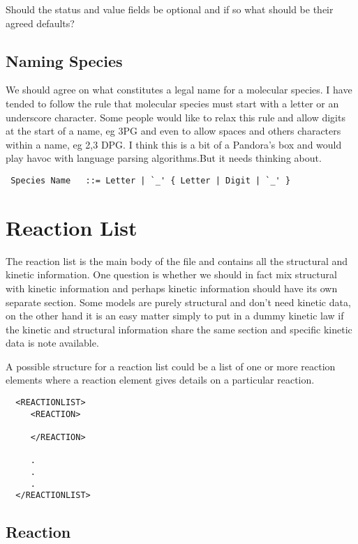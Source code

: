 \documentclass{article}
\begin{document}
Should the status and value fields be optional and if so what should be their
agreed defaults?


\subsection*{Naming Species}

We should agree on what constitutes a legal name for a molecular species. I
have tended to follow the rule that molecular species must start with a letter
or an underscore character. Some people would like to relax this rule and
allow digits at the start of a name, eg 3PG and even to allow spaces and others
characters within a name, eg 2,3 DPG. I think this is a bit of a Pandora's box
and would play havoc with language parsing algorithms.But it needs thinking
about.

\begin{verbatim}
 Species Name   ::= Letter | `_' { Letter | Digit | `_' }
\end{verbatim}


\section*{Reaction List}

The reaction list is the main body of the file and contains all the structural
and kinetic information. One question is whether we should in fact mix
structural with kinetic information and perhaps kinetic information should have
its own separate section. Some models are purely structural and don't need
kinetic data, on the other hand it is an easy matter simply to put in a dummy
kinetic law if the kinetic and structural information share the same section and
specific kinetic data is note available.

A possible structure for a reaction list could be a list of one or more
reaction elements where a reaction element gives details on a particular
reaction.

{\footnotesize
\begin{verbatim}
  <REACTIONLIST>
     <REACTION>

     </REACTION>

     .
     .
     .
  </REACTIONLIST>
\end{verbatim} }


\subsection*{Reaction}
\end{document}
